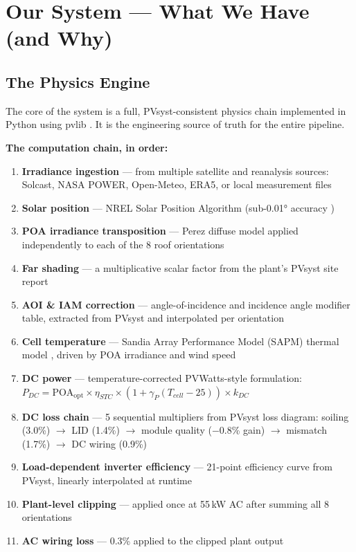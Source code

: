 \documentclass[11pt, a4paper]{article}
\begin{document}
\section{Our System --- What We Have (and Why)}

\subsection{The Physics Engine}

The core of the system is a full, PVsyst-consistent physics chain implemented
in Python using pvlib \cite{holmgren2018pvlib}. It is the engineering
source of truth for the entire pipeline.

\textbf{The computation chain, in order:}

\begin{enumerate}
  \item \textbf{Irradiance ingestion} --- from multiple satellite and reanalysis
    sources: Solcast, NASA POWER, Open-Meteo, ERA5, or local measurement files
  \item \textbf{Solar position} --- NREL Solar Position Algorithm (sub-0.01°
    accuracy \cite{reda2004solar})
  \item \textbf{POA irradiance transposition} --- Perez diffuse model
    \cite{perez1990set} applied independently to each of the 8 roof orientations
  \item \textbf{Far shading} --- a multiplicative scalar factor from the plant's
    PVsyst site report
  \item \textbf{AOI \& IAM correction} --- angle-of-incidence and incidence
    angle modifier table, extracted from PVsyst and interpolated per orientation
    \cite{deline2011broken}
  \item \textbf{Cell temperature} --- Sandia Array Performance Model (SAPM)
    thermal model \cite{king2004photovoltaic}, driven by POA irradiance and
    wind speed
  \item \textbf{DC power} --- temperature-corrected PVWatts-style formulation:
    $P_{DC} = \text{POA}_{\text{opt}} \times \eta_{STC}
    \times (1 + \gamma_P (T_{cell} - 25)) \times k_{DC}$
  \item \textbf{DC loss chain} --- 5 sequential multipliers from PVsyst loss
    diagram:
    soiling (3.0\%) $\to$ LID (1.4\%) $\to$ module quality ($-$0.8\% gain)
    $\to$ mismatch (1.7\%) $\to$ DC wiring (0.9\%)
  \item \textbf{Load-dependent inverter efficiency} --- 21-point efficiency
    curve from PVsyst, linearly interpolated at runtime
  \item \textbf{Plant-level clipping} --- applied once at 55\,kW AC after
    summing all 8 orientations
  \item \textbf{AC wiring loss} --- 0.3\% applied to the clipped plant output
\end{enumerate}
\end{document}
